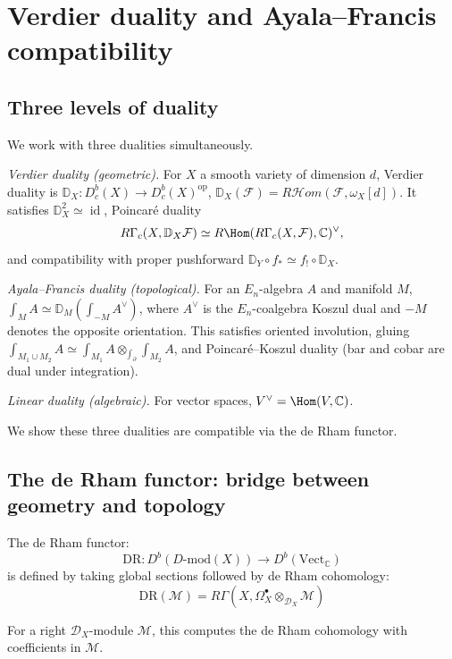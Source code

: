 \section{Verdier duality and Ayala--Francis compatibility}
\label{sec:verdier-ayala-francis}

\subsection{Three levels of duality}
\label{subsec:three-dualities}

\begin{definition}\label{def:three-dualities}
We work with three dualities simultaneously.

\emph{Verdier duality (geometric).}
For $X$ a smooth variety of dimension $d$, Verdier duality is
$\mathbb{D}_X\colon D^b_c(X) \to D^b_c(X)^{\mathrm{op}}$,
$\mathbb{D}_X(\mathcal{F}) = R\mathcal{H}om(\mathcal{F}, \omega_X[d])$.
It satisfies $\mathbb{D}_X^2 \simeq \operatorname{id}$, Poincar\'e duality
\[
R\Gamma_c(X, \mathbb{D}_X \mathcal{F})
\simeq R\Hom(R\Gamma_c(X, \mathcal{F}), \mathbb{C})^\vee,
\]
and compatibility with proper pushforward
$\mathbb{D}_Y \circ f_* \simeq f_! \circ \mathbb{D}_X$.

\emph{Ayala--Francis duality (topological).}
For an $E_n$-algebra $A$ and manifold $M$,
$\int_M A \simeq \mathbb{D}_M(\int_{-M} A^\vee)$,
where $A^\vee$ is the $E_n$-coalgebra Koszul dual and $-M$ denotes the opposite orientation.
This satisfies oriented involution, gluing
$\int_{M_1 \cup M_2} A \simeq \int_{M_1} A \otimes_{\int_{\partial}} \int_{M_2} A$,
and Poincar\'e--Koszul duality (bar and cobar are dual under integration).

\emph{Linear duality (algebraic).}
For vector spaces, $V^\vee = \Hom(V, \mathbb{C})$.

We show these three dualities are compatible via the de Rham functor.
\end{definition}

\subsection{The de Rham functor: bridge between geometry and topology}
\label{subsec:de-rham-functor}

\begin{definition}\label{def:de-rham-functor}
The de Rham functor:
\[\text{DR}: D^b(D\text{-mod}(X)) \to D^b(\text{Vect}_\mathbb{C})\]
is defined by taking global sections followed by de Rham cohomology:
\[\text{DR}(\mathcal{M}) = R\Gamma(X, \Omega^\bullet_X \otimes_{\mathcal{D}_X} \mathcal{M})\]

For a right $\mathcal{D}_X$-module $\mathcal{M}$, this computes
the de Rham cohomology with coefficients in $\mathcal{M}$.
\end{definition}

